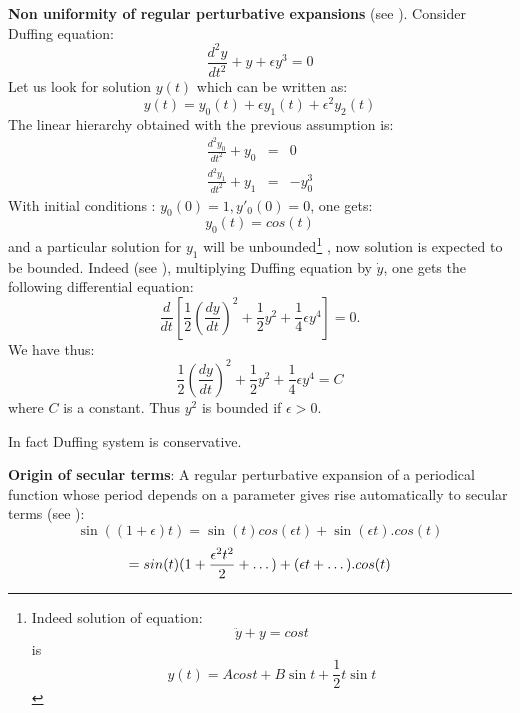 \documentclass[12pt]{book}
\begin{document}
\begin{exmp}
{\bf Non uniformity of regular perturbative expansions} (see 
\cite{ma:equad:Bender87}). Consider Duffing equation:
\begin{equation}
\frac{d^2y}{dt^2}+y+\epsilon y^3=0
\end{equation}
Let us look for solution $y(t)$ which can be written as:
\begin{equation}
y(t)=y_0(t)+\epsilon y_1(t)+\epsilon^2 y_2(t)
\end{equation}
The linear hierarchy obtained with the previous assumption is:
\begin{eqnarray}
\frac{d^2y_0}{dt^2}+y_0&=&0\\
\frac{d^2y_1}{dt^2}+y_1&=&-y_0^3
\end{eqnarray}
With initial conditions : $y_0(0)=1,y'_0(0)=0$, one gets:
\begin{equation}
y_0(t)=cos(t)
\end{equation}
and a particular solution for $y_1$ will be unbounded\footnote{%
Indeed solution of equation:
\begin{equation}
\ddot y+y=cos t
\end{equation}
is
\begin{equation}
y(t)=A cos t+ B \sin t+\frac{1}{2}t \sin t
\end{equation}
}%
, now solution is expected to be bounded.
Indeed (see \cite{ma:equad:Bender87}), multiplying Duffing equation by $\dot
y$, one gets the following differential equation:
\begin{equation}
\frac{d}{dt}[\frac{1}{2}(\frac{dy}{dt})^2+
\frac{1}{2}y^2+\frac{1}{4}\epsilon y^4]=0.
\end{equation}
We have thus:
\begin{equation}
\frac{1}{2}(\frac{dy}{dt})^2+\frac{1}{2}y^2+\frac{1}{4}\epsilon
y^4=C
\end{equation}
where $C$ is a constant. Thus  $y^2$ is bounded if $\epsilon > 0$. 
\begin{rem}
In fact Duffing system is conservative.
\end{rem}
\end{exmp}
\begin{rem}
{\bf Origin of secular terms}: A regular perturbative expansion of a
periodical function whose period depends on a parameter gives rise
automatically to secular terms (see
\cite{ma:equad:Bender87}): 
\begin{equation}
\sin((1+\epsilon) t)=\sin(t)cos(\epsilon t)+\sin(\epsilon t).cos(t)
\end{equation}
\begin{equation}
=\\sin(t)(1+\frac{\epsilon^2t^2}{2}+\dots)+(\epsilon t+\dots).cos(t)
\end{equation}
\end{rem}
\end{document}
